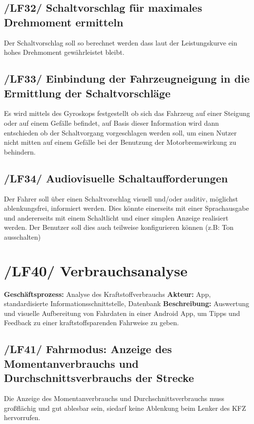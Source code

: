 \subsection{/LF32/ Schaltvorschlag für maximales Drehmoment ermitteln}
\newline
Der Schaltvorschlag soll so berechnet werden dass laut der Leistungskurve ein hohes Drehmoment gewährleistet bleibt. 

\subsection{/LF33/ Einbindung der Fahrzeugneigung in die Ermittlung der Schaltvorschläge}
\newline
Es wird mittels des Gyroskops festgestellt ob sich das Fahrzeug auf einer Steigung oder auf einem Gefälle befindet, auf Basis dieser Information wird dann entschieden ob der Schaltvorgang vorgeschlagen werden soll, um einen Nutzer nicht mitten auf einem Gefälle bei der Benutzung der Motorbremswirkung zu behindern. 

\subsection{/LF34/ Audiovisuelle Schaltaufforderungen}
\newline
Der Fahrer soll über einen Schaltvorschlag visuell und/oder auditiv, möglichst ablenkungsfrei, informiert werden. Dies könnte einerseits mit einer Sprachausgabe und andererseits mit einem Schaltlicht und einer simplen Anzeige realisiert werden. Der Benutzer soll dies auch teilweise konfigurieren können (z.B: Ton ausschalten)

\newpage
\section{/LF40/ Verbrauchsanalyse}
\textbf{Geschäftsprozess:}	Analyse des Kraftstoffverbrauchs
\newline
\textbf{Akteur:}		App, standardisierte Informationsschnittstelle, Datenbank
\newline
\textbf{Beschreibung:} Auswertung und visuelle Aufbereitung von Fahrdaten in einer Android App, um Tipps und Feedback zu einer kraftstoffsparenden Fahrweise zu geben.

\subsection{/LF41/ Fahrmodus: Anzeige des Momentanverbrauchs und Durchschnittsverbrauchs der Strecke}
\newline
Die Anzeige des Momentanverbrauchs und Durchschnittsverbrauchs muss großflächig und gut ablesbar sein, siedarf  keine Ablenkung beim Lenker des KFZ hervorrufen. 

